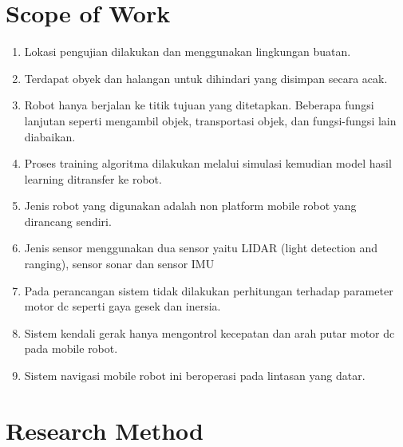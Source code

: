     
\section{Scope of Work}

\begin{enumerate}
	\item Lokasi pengujian dilakukan dan menggunakan lingkungan buatan.
	\item Terdapat obyek dan halangan untuk dihindari yang disimpan secara acak.
	\item Robot hanya berjalan ke titik tujuan yang ditetapkan. Beberapa fungsi lanjutan seperti mengambil objek, transportasi objek, dan fungsi-fungsi lain diabaikan.
	\item Proses training algoritma dilakukan melalui simulasi kemudian model hasil learning ditransfer ke robot.
	\item Jenis robot yang digunakan adalah non platform mobile robot yang dirancang sendiri.
	\item Jenis sensor menggunakan dua sensor yaitu LIDAR (light detection and ranging), sensor sonar dan sensor IMU
	\item Pada perancangan sistem tidak dilakukan perhitungan terhadap parameter motor dc seperti gaya gesek dan inersia.
	\item Sistem kendali gerak hanya mengontrol kecepatan dan arah putar motor dc pada mobile robot.
	\item Sistem navigasi mobile robot ini beroperasi pada lintasan yang datar.
\end{enumerate}


\section{Research Method}

